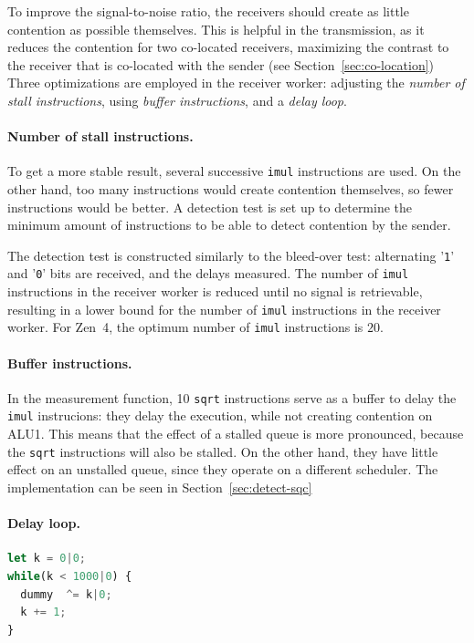 \documentclass[11pt,
  titlepage=false,
  parskip=half,      %
]{scrreprt}
\begin{document}
To improve the signal-to-noise ratio, the receivers should create as little contention as possible themselves.
This is helpful in the transmission, as it reduces the contention for two co-located receivers,
maximizing the contrast to the receiver that is co-located with the sender (see Section~\ref{sec:co-location})
Three optimizations are employed in the receiver worker: adjusting the \textit{number of stall instructions},
using \textit{buffer instructions}, and a \textit{delay loop}.

\paragraph{Number of stall instructions.}
To get a more stable result, several successive \texttt{imul} instructions are used.
On the other hand, too many instructions would create contention themselves, so fewer instructions would be better.
A detection test is set up to determine the minimum amount of instructions to be able to detect contention by the sender.

The detection test is constructed similarly to the bleed-over test:
alternating '\texttt{1}' and '\texttt{0}' bits are received, and the delays measured.
The number of \texttt{imul} instructions in the receiver worker is reduced until no signal is retrievable,
resulting in a lower bound for the number of \texttt{imul} instructions in the receiver worker.
For Zen~4, the optimum number of \texttt{imul} instructions is $20$.

\paragraph{Buffer instructions.}
In the measurement function, 10 \texttt{sqrt} instructions serve as a buffer to delay the \texttt{imul} instrucions:
they delay the execution, while not creating contention on ALU1.
This means that the effect of a stalled queue is more pronounced, because the \texttt{sqrt} instructions will also be stalled.
On the other hand, they have little effect on an unstalled queue, since they operate on a different scheduler.
The implementation can be seen in Section~\ref{sec:detect-sqc}

\paragraph{Delay loop.}
\begin{lstlisting}[float,caption={The delay loop after a measurement},label={lst:delayloop},language=JavaScript]
let k = 0|0;
while(k < 1000|0) {
  dummy  ^= k|0;
  k += 1;
}
\end{lstlisting}
\end{document}

